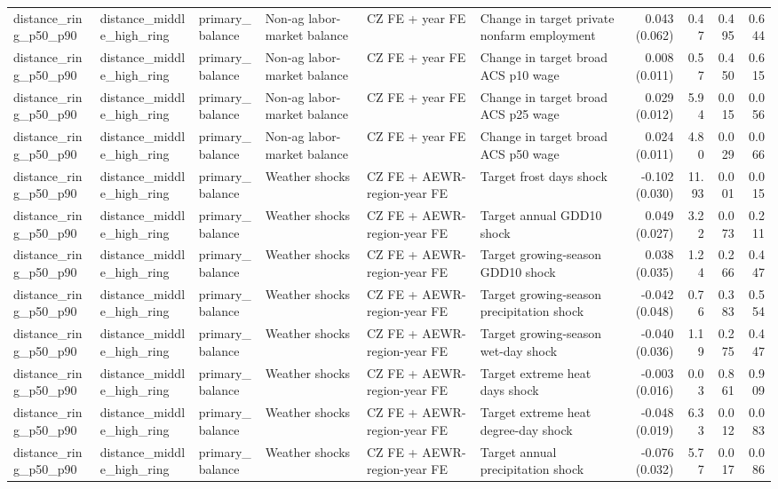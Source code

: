 \begin{tabular}{llllllrrrr}
distance_ring_p50_p90 & distance_middle_high_ring & primary_balance & Non-ag labor-market balance & CZ FE + year FE & Change in target private nonfarm employment & 0.043 (0.062) & 0.47 & 0.495 & 0.644 \\
distance_ring_p50_p90 & distance_middle_high_ring & primary_balance & Non-ag labor-market balance & CZ FE + year FE & Change in target broad ACS p10 wage & 0.008 (0.011) & 0.57 & 0.450 & 0.615 \\
distance_ring_p50_p90 & distance_middle_high_ring & primary_balance & Non-ag labor-market balance & CZ FE + year FE & Change in target broad ACS p25 wage & 0.029 (0.012) & 5.94 & 0.015 & 0.056 \\
distance_ring_p50_p90 & distance_middle_high_ring & primary_balance & Non-ag labor-market balance & CZ FE + year FE & Change in target broad ACS p50 wage & 0.024 (0.011) & 4.80 & 0.029 & 0.066 \\
distance_ring_p50_p90 & distance_middle_high_ring & primary_balance & Weather shocks & CZ FE + AEWR-region-year FE & Target frost days shock & -0.102 (0.030) & 11.93 & 0.001 & 0.015 \\
distance_ring_p50_p90 & distance_middle_high_ring & primary_balance & Weather shocks & CZ FE + AEWR-region-year FE & Target annual GDD10 shock & 0.049 (0.027) & 3.22 & 0.073 & 0.211 \\
distance_ring_p50_p90 & distance_middle_high_ring & primary_balance & Weather shocks & CZ FE + AEWR-region-year FE & Target growing-season GDD10 shock & 0.038 (0.035) & 1.24 & 0.266 & 0.447 \\
distance_ring_p50_p90 & distance_middle_high_ring & primary_balance & Weather shocks & CZ FE + AEWR-region-year FE & Target growing-season precipitation shock & -0.042 (0.048) & 0.76 & 0.383 & 0.554 \\
distance_ring_p50_p90 & distance_middle_high_ring & primary_balance & Weather shocks & CZ FE + AEWR-region-year FE & Target growing-season wet-day shock & -0.040 (0.036) & 1.19 & 0.275 & 0.447 \\
distance_ring_p50_p90 & distance_middle_high_ring & primary_balance & Weather shocks & CZ FE + AEWR-region-year FE & Target extreme heat days shock & -0.003 (0.016) & 0.03 & 0.861 & 0.909 \\
distance_ring_p50_p90 & distance_middle_high_ring & primary_balance & Weather shocks & CZ FE + AEWR-region-year FE & Target extreme heat degree-day shock & -0.048 (0.019) & 6.33 & 0.012 & 0.083 \\
distance_ring_p50_p90 & distance_middle_high_ring & primary_balance & Weather shocks & CZ FE + AEWR-region-year FE & Target annual precipitation shock & -0.076 (0.032) & 5.77 & 0.017 & 0.086 \\

\end{tabular}
